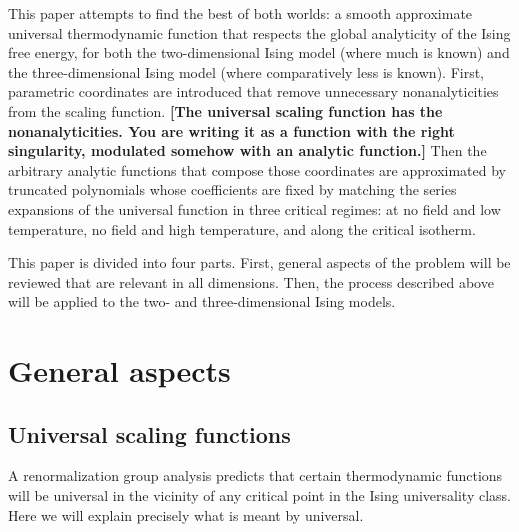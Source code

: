 \documentclass[
  aps,
  pre,
  reprint,
  longbibliography,
  floatfix
]{revtex4-2}
\begin{document}
This paper attempts to find the best of both worlds: a smooth approximate
universal thermodynamic function that respects the global analyticity of the
Ising free energy, for both the two-dimensional Ising model (where much is
known) and the three-dimensional Ising model (where comparatively less is
known). First, parametric coordinates are introduced that remove unnecessary
nonanalyticities from the scaling function. {\bf [The universal scaling function has the nonanalyticities. You are writing it as a function with the right singularity, modulated somehow with an analytic function.]} Then the arbitrary analytic
functions that compose those coordinates are approximated by truncated
polynomials whose coefficients are fixed by matching the series expansions of
the universal function in three critical regimes: at no field and low
temperature, no field and high temperature, and along the critical isotherm.

This paper is divided into four parts. First, general aspects of the problem
will be reviewed that are relevant in all dimensions. Then, the process
described above will be applied to the two- and three-dimensional Ising models.

\section{General aspects}

\subsection{Universal scaling functions}

A renormalization group analysis predicts that certain thermodynamic functions
will be universal in the vicinity of any critical point in the Ising
universality class. Here we will explain precisely what is meant by universal.
\end{document}
